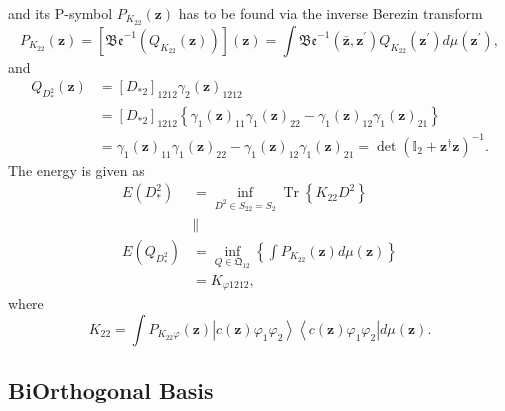 \documentclass[aps,preprint]{revtex4}%
\begin{document}
and its P-symbol $P_{K_{22}}\left(  \mathbf{z}\right)  $ has to be found via
the inverse Berezin transform
\begin{equation}
P_{K_{22}}\left(  \mathbf{z}\right)  =\left[  \mathfrak{Be}^{-1}\left(
Q_{K_{22}}\left(  \mathbf{z}\right)  \right)  \right]  \left(  \mathbf{z}%
\right)  =\int\mathfrak{Be}^{-1}\left(  \mathbf{\bar{z},z}^{\prime}\right)
Q_{K_{22}}\left(  \mathbf{z}^{\prime}\right)  d\mu\left(  \mathbf{z}^{\prime
}\right)  ,
\end{equation}
and%
\begin{align}
Q_{D_{\ast}^{2}}\left(  \mathbf{z}\right)   &  =\left[  D_{\ast2}\right]
_{1212}\gamma_{2}\left(  \mathbf{z}\right)  _{1212}\nonumber\\
&  =\left[  D_{\ast2}\right]  _{1212}\left\{  \gamma_{1}\left(  \mathbf{z}%
\right)  _{11}\gamma_{1}\left(  \mathbf{z}\right)  _{22}-\gamma_{1}\left(
\mathbf{z}\right)  _{12}\gamma_{1}\left(  \mathbf{z}\right)  _{21}\right\}
\nonumber\\
&  =\gamma_{1}\left(  \mathbf{z}\right)  _{11}\gamma_{1}\left(  \mathbf{z}%
\right)  _{22}-\gamma_{1}\left(  \mathbf{z}\right)  _{12}\gamma_{1}\left(
\mathbf{z}\right)  _{21}=\det\left(  \mathbb{I}_{2}+\mathbf{z}^{\dagger
}\mathbf{z}\right)  ^{-1}.
\end{align}
The energy is given as
\begin{align}
E\left(  D_{\ast}^{2}\right)   &  =\inf_{D^{2}\in S_{22}=S_{2}}%
\operatorname*{Tr}\left\{  K_{22}D^{2}\right\}  \nonumber\\
&  \parallel\nonumber\\
E\left(  Q_{D_{\ast}^{2}}\right)   &  =\inf_{Q\in\mathfrak{Q}_{12}}\left\{
\int P_{K_{22}}\left(  \mathbf{z}\right)  d\mu\left(  \mathbf{z}\right)
\right\}  \nonumber\\
&  =K_{\varphi1212},
\end{align}
where%
\begin{equation}
K_{22}=\int P_{K_{22}\varphi}\left(  \mathbf{z}\right)  \left\vert c\left(
\mathbf{z}\right)  \varphi_{1}\varphi_{2}\right\rangle \left\langle c\left(
\mathbf{z}\right)  \varphi_{1}\varphi_{2}\right\vert d\mu\left(
\mathbf{z}\right)  .
\end{equation}


\subsection{BiOrthogonal Basis}%
\end{document}
